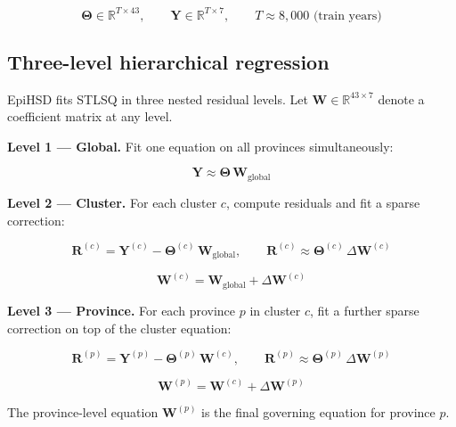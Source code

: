\documentclass{article}
\begin{document}
\begin{equation}
    \boldsymbol{\Theta} \in \mathbb{R}^{T \times 43},
    \qquad
    \mathbf{Y} \in \mathbb{R}^{T \times 7},
    \qquad T \approx 8{,}000 \text{ (train years)}
\end{equation}

\subsection*{Three-level hierarchical regression}

EpiHSD fits STLSQ in three nested residual levels.
Let $\mathbf{W} \in \mathbb{R}^{43 \times 7}$ denote a coefficient matrix at any level.

\medskip
\noindent\textbf{Level 1 — Global.}
Fit one equation on all provinces simultaneously:

\begin{equation}
    \mathbf{Y} \approx \boldsymbol{\Theta}\,\mathbf{W}_{\text{global}}
\end{equation}

\noindent\textbf{Level 2 — Cluster.}
For each cluster $c$, compute residuals and fit a sparse correction:

\begin{equation}
    \mathbf{R}^{(c)} = \mathbf{Y}^{(c)} - \boldsymbol{\Theta}^{(c)}\,\mathbf{W}_{\text{global}},
    \qquad
    \mathbf{R}^{(c)} \approx \boldsymbol{\Theta}^{(c)}\,\Delta\mathbf{W}^{(c)}
\end{equation}

\begin{equation}
    \mathbf{W}^{(c)} = \mathbf{W}_{\text{global}} + \Delta\mathbf{W}^{(c)}
\end{equation}

\noindent\textbf{Level 3 — Province.}
For each province $p$ in cluster $c$, fit a further sparse correction on top of the cluster equation:

\begin{equation}
    \mathbf{R}^{(p)} = \mathbf{Y}^{(p)} - \boldsymbol{\Theta}^{(p)}\,\mathbf{W}^{(c)},
    \qquad
    \mathbf{R}^{(p)} \approx \boldsymbol{\Theta}^{(p)}\,\Delta\mathbf{W}^{(p)}
\end{equation}

\begin{equation}
    \mathbf{W}^{(p)} = \mathbf{W}^{(c)} + \Delta\mathbf{W}^{(p)}
\end{equation}

\noindent The province-level equation $\mathbf{W}^{(p)}$ is the final governing equation for province $p$.
\end{document}
